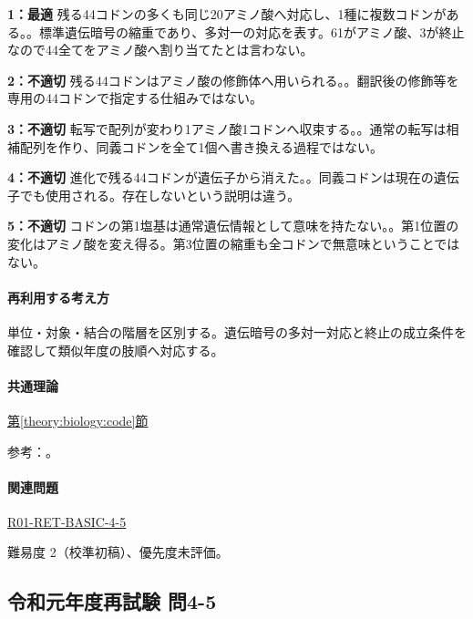 \noindent\textbf{1：最適} 残る44コドンの多くも同じ20アミノ酸へ対応し、1種に複数コドンがある。。標準遺伝暗号の縮重であり、多対一の対応を表す。61がアミノ酸、3が終止なので44全てをアミノ酸へ割り当てたとは言わない。\par

\noindent\textbf{2：不適切} 残る44コドンはアミノ酸の修飾体へ用いられる。。翻訳後の修飾等を専用の44コドンで指定する仕組みではない。\par

\noindent\textbf{3：不適切} 転写で配列が変わり1アミノ酸1コドンへ収束する。。通常の転写は相補配列を作り、同義コドンを全て1個へ書き換える過程ではない。\par

\noindent\textbf{4：不適切} 進化で残る44コドンが遺伝子から消えた。。同義コドンは現在の遺伝子でも使用される。存在しないという説明は違う。\par

\noindent\textbf{5：不適切} コドンの第1塩基は通常遺伝情報として意味を持たない。。第1位置の変化はアミノ酸を変え得る。第3位置の縮重も全コドンで無意味ということではない。\par

\paragraph{再利用する考え方} 単位・対象・結合の階層を区別する。遺伝暗号の多対一対応と終止の成立条件を確認して類似年度の肢順へ対応する。

\paragraph{共通理論} \hyperref[theory:biology:code]{第\ref*{theory:biology:code}節}

\par 参考：\cite{nhgri_codon}。

\paragraph{関連問題} \hyperref[q:r01-ret-basic-4-5]{R01-RET-BASIC-4-5}

\par 難易度 2（校準初稿）、優先度未評価。

\subsection{令和元年度再試験 問4-5}
\label{q:r01-ret-basic-4-5}


